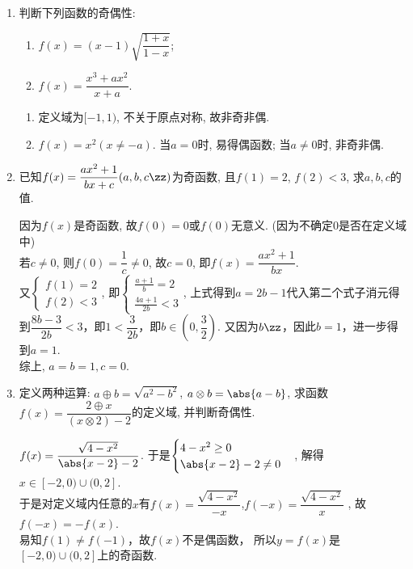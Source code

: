 \begin{enumerate}
\item 判断下列函数的奇偶性: 
\begin{enumerate}
\item $f(x)=(x-1)\sqrt{\dfrac{1+x}{1-x}}$; 
\item $f(x)=\dfrac{x^3+ax^2}{x+a}$. 
\end{enumerate}
\begin{jieda}
\begin{enumerate}
\item 定义域为$[-1,1)$, 不关于原点对称, 故非奇非偶. 
\item $f(x)=x^2(x\neq -a)$. 当$a=0$时, 易得偶函数; 当$a\neq 0$时, 非奇非偶. 
\end{enumerate}
\end{jieda}
\begin{vspace_}
\vsp[3]
\end{vspace_}


\item 已知$f(x)=\dfrac{ax^2+1}{bx+c}(a,b,c\zz)$为奇函数, 且$f(1)=2$, $f(2)<3$, 求$a,b,c$的值. 
\begin{jieda}
因为$f(x)$是奇函数, 故$f(0)=0$或$f(0)$无意义. (因为不确定$0$是否在定义域中)\\
若$c\neq 0$, 则$f(0)=\dfrac{1}{c}\neq 0$, 故$c=0$, 即$f(x)=\dfrac{ax^2+1}{bx}$. \\
又$\begin{cases}
f(1)=2\\
f(2)<3
\end{cases}$, 
即$\begin{cases}
\frac{a+1}{b}=2\\
\frac{4a+1}{2b}<3
\end{cases}$, 上式得到$a = 2b-1$代入第二个式子消元得到$\dfrac{8b-3}{2b}<3$，即$1 < \dfrac{3}{2b}$，即$b \in (0, \dfrac{3}{2})$. 又因为$b \zz$，因此$b = 1$，进一步得到$a = 1$. \\
综上, $a=b=1, c=0$. 
\end{jieda}
\begin{vspace_}
\vsp[5]
\end{vspace_}

\item 定义两种运算: $a\oplus b=\sqrt{a^2-b^2}$, $a\otimes b=\abs{a-b}$, 
求函数$f(x)=\dfrac{2\oplus x}{(x\otimes 2)-2}$的定义域, 并判断奇偶性. 
\begin{jieda}
$f(x)=\dfrac{\sqrt{4-x^2}}{\abs{x-2}-2}$. 
于是$\begin{cases}
4-x^2\geq 0\\
\abs{x-2}-2\neq 0
\end{cases}$, 解得$x\in[-2,0)\cup(0,2]$. \\
于是对定义域内任意的$x$有$f(x)=\dfrac{\sqrt{4-x^2}}{-x}$,$f(-x)=\dfrac{\sqrt{4-x^2}}{x}$ , 故$f(-x)=-f(x)$. \\
易知$f(1) \neq f(-1)$，故$f(x)$不是偶函数，
所以$y=f(x)$是$[-2,0)\cup(0,2]$上的奇函数. 
\end{jieda}
\begin{vspace_}
\vsp[4]
\end{vspace_}



\end{enumerate}
